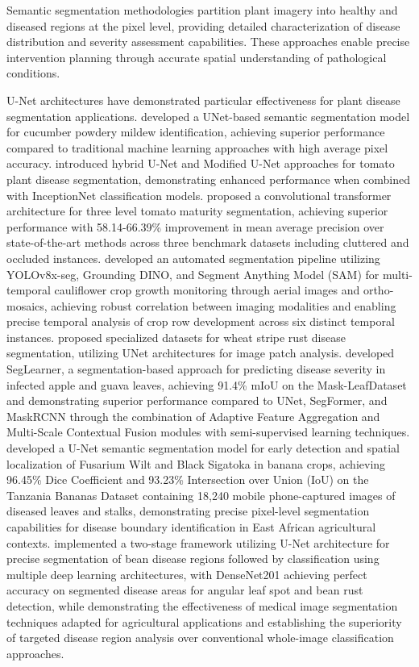 \documentclass[sn-mathphys]{sn-jnl}
\theoremstyle{thmstyleone}%
\theoremstyle{thmstyletwo}%
\theoremstyle{thmstylethree}%
\begin{document}
Semantic segmentation methodologies partition plant imagery into healthy and diseased regions at the pixel level, providing detailed characterization of disease distribution and severity assessment capabilities. These approaches enable precise intervention planning through accurate spatial understanding of pathological conditions.

U-Net architectures have demonstrated particular effectiveness for plant disease segmentation applications. \citet{lin2019deep} developed a UNet-based semantic segmentation model for cucumber powdery mildew identification, achieving superior performance compared to traditional machine learning approaches with high average pixel accuracy. \citet{shoaib2022deep} introduced hybrid U-Net and Modified U-Net approaches for tomato plant disease segmentation, demonstrating enhanced performance when combined with InceptionNet classification models. \citet{khan2023tomato} proposed a convolutional transformer architecture for three level tomato maturity segmentation, achieving superior performance with 58.14-66.39\% improvement in mean average precision over state-of-the-art methods across three benchmark datasets including cluttered and occluded instances. \citet{rana2024crop} developed an automated segmentation pipeline utilizing YOLOv8x-seg, Grounding DINO, and Segment Anything Model (SAM) for multi-temporal cauliflower crop growth monitoring through aerial images and ortho-mosaics, achieving robust correlation between imaging modalities and enabling precise temporal analysis of crop row development across six distinct temporal instances. \citet{anwar2023nwrd} proposed specialized datasets for wheat stripe rust disease segmentation, utilizing UNet architectures for image patch analysis. \citet{upadhyay2025seglearner} developed SegLearner, a segmentation-based approach for predicting disease severity in infected apple and guava leaves, achieving 91.4\% mIoU on the Mask-LeafDataset and demonstrating superior performance compared to UNet, SegFormer, and MaskRCNN through the combination of Adaptive Feature Aggregation and Multi-Scale Contextual Fusion modules with semi-supervised learning techniques. \citet{elinisa2025image} developed a U-Net semantic segmentation model for early detection and spatial localization of Fusarium Wilt and Black Sigatoka in banana crops, achieving 96.45\% Dice Coefficient and 93.23\% Intersection over Union (IoU) on the Tanzania Bananas Dataset containing 18,240 mobile phone-captured images of diseased leaves and stalks, demonstrating precise pixel-level segmentation capabilities for disease boundary identification in East African agricultural contexts. \citet{kursun2023segmentation} implemented a two-stage framework utilizing U-Net architecture for precise segmentation of bean disease regions followed by classification using multiple deep learning architectures, with DenseNet201 achieving perfect accuracy on segmented disease areas for angular leaf spot and bean rust detection, while demonstrating the effectiveness of medical image segmentation techniques adapted for agricultural applications and establishing the superiority of targeted disease region analysis over conventional whole-image classification approaches.
\end{document}
